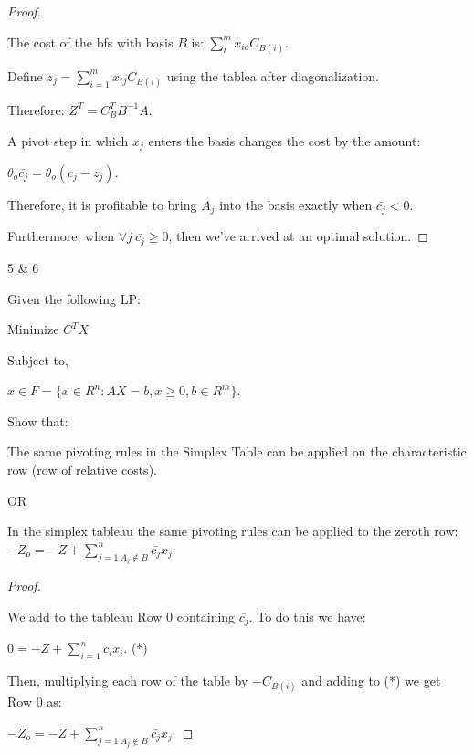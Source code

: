 \documentclass{article}
\begin{document}
\begin{proof}
  $ $
  
  The cost of the bfs with basis $B$ is: $\sum_{i}^{m} x_{io} C_{B(i)}$.
  \newline

  Define $z_j = \sum_{i=1}^{m} x_{ij} C_{B(i)}$ using the tablea after diagonalization.
  
  Therefore: $Z^T = C_B^T B^{-1} A $.
  \newline

  A pivot step in which $x_j$ enters the basis changes the cost by the amount: 

  \qquad $\theta_o \bar{c_j} = \theta_o (c_j - z_j)$.
  \newline

  Therefore, it is profitable to bring $A_j$ into the basis exactly when $\bar{c_j} < 0$.
  \newline

  Furthermore, when $\forall j \ \bar{c_j} \geq 0$, then we've arrived at an optimal solution.
  

\end{proof}

\newpage

\begin{customthm}{5 \& 6}
  $ $

  Given the following LP: 
  
  \qquad Minimize $C^TX$ 
  
  Subject to, 
  
  \qquad $x \in F = \{x \in R^n: AX=b, x\geq 0, b\in R^m \}$.
  \newline

  Show that:

  \qquad The same pivoting rules in the Simplex Table can be applied on the characteristic row (row of relative costs).
  \newline

  OR
  \newline

  \qquad  In the simplex tableau the same pivoting rules can be applied to the zeroth row: $-Z_o= -Z+ \sum_{j=1 \ A_j \notin B}^{n} \bar{c_j}x_j$.

\end{customthm}

\begin{proof}
  $ $

  We add to the tableau Row 0 containing $\bar{c_j}$. To do this we have:
  
  \qquad $0 = -Z + \sum_{i=1}^{n} c_i x_i$. \qquad (*)
  \newline

  Then, multiplying each row of the table by $-C_{B(i)}$ and adding to (*) we get Row 0 as:

  \qquad $-Z_o =  -Z + \sum_{j=1 \ A_j \notin B}^{n} \bar{c_j} x_j$.

  

\end{proof}
\end{document}
